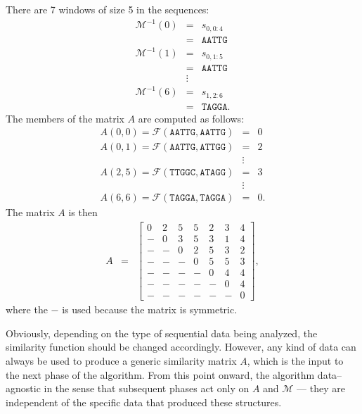         There are 7 windows of size 5 in the sequences:
        \begin{eqnarray*}
            \mathscr{M}^{-1}(0) & = &   s_{0,0:4} \\
                    & = &   \texttt{AATTG}\\
            \mathscr{M}^{-1}(1) & = &   s_{0,1:5} \\
                    & = &   \texttt{AATTG} \\
                    & \vdots & \\
            \mathscr{M}^{-1}(6) & = &   s_{1,2:6} \\
                    & = &   \texttt{TAGGA}.
        \end{eqnarray*}
        The members of the matrix $A$ are computed as follows:
        \begin{eqnarray*}
            A(0,0) = \mathscr{F}(\texttt{AATTG},\texttt{AATTG}) & = & 0 \\
            A(0,1) = \mathscr{F}(\texttt{AATTG},\texttt{ATTGG}) & = & 2 \\
                    & \vdots & \\
            A(2,5) = \mathscr{F}(\texttt{TTGGC},\texttt{ATAGG}) & = & 3 \\
                    & \vdots & \\
            A(6,6) = \mathscr{F}(\texttt{TAGGA},\texttt{TAGGA}) & = & 0.
        \end{eqnarray*}
        The matrix $A$ is then
        \begin{eqnarray*}
            A   & = &   \begin{bmatrix}
                    0 & 2 &  5 & 5 & 2 & 3 & 4 \\
                    - & 0 &  3 & 5 & 3 & 1 & 4 \\
                    - & - &  0 & 2 & 5 & 3 & 2 \\
                    - & - &  - & 0 & 5 & 5 & 3 \\
                    - & - &  - & - & 0 & 4 & 4 \\
                    - & - &  - & - & - & 0 & 4 \\
                    - & - &  - & - & - & - & 0
                \end{bmatrix},
        \end{eqnarray*}
        where the $-$ is used because the matrix is symmetric.

        Obviously, depending on the type of sequential data being
        analyzed, the similarity function should be changed
        accordingly.  However, any kind of data can always be used
        to produce a generic similarity matrix $A$, which is the
        input to the next phase of the algorithm.  From this point
        onward, the algorithm data--agnostic in the sense that
        subsequent phases act only on $A$ and $\mathscr{M}$ --- they are
        independent of the specific data that produced these structures.

